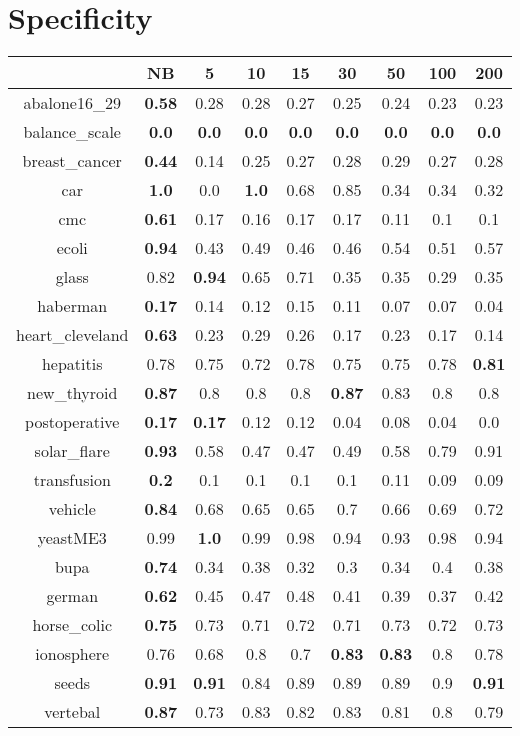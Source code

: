 \documentclass{article}%
\begin{document}
%
\section*{Specificity}%
\begin{tabular}{c|cccccccc}%
\hline%
&NB&5&10&15&30&50&100&200\\%
\hline%
abalone16\_29&\textbf{0.58}&0.28&0.28&0.27&0.25&0.24&0.23&0.23\\%
\hline%
balance\_scale&\textbf{0.0}&\textbf{0.0}&\textbf{0.0}&\textbf{0.0}&\textbf{0.0}&\textbf{0.0}&\textbf{0.0}&\textbf{0.0}\\%
\hline%
breast\_cancer&\textbf{0.44}&0.14&0.25&0.27&0.28&0.29&0.27&0.28\\%
\hline%
car&\textbf{1.0}&0.0&\textbf{1.0}&0.68&0.85&0.34&0.34&0.32\\%
\hline%
cmc&\textbf{0.61}&0.17&0.16&0.17&0.17&0.11&0.1&0.1\\%
\hline%
ecoli&\textbf{0.94}&0.43&0.49&0.46&0.46&0.54&0.51&0.57\\%
\hline%
glass&0.82&\textbf{0.94}&0.65&0.71&0.35&0.35&0.29&0.35\\%
\hline%
haberman&\textbf{0.17}&0.14&0.12&0.15&0.11&0.07&0.07&0.04\\%
\hline%
heart\_cleveland&\textbf{0.63}&0.23&0.29&0.26&0.17&0.23&0.17&0.14\\%
\hline%
hepatitis&0.78&0.75&0.72&0.78&0.75&0.75&0.78&\textbf{0.81}\\%
\hline%
new\_thyroid&\textbf{0.87}&0.8&0.8&0.8&\textbf{0.87}&0.83&0.8&0.8\\%
\hline%
postoperative&\textbf{0.17}&\textbf{0.17}&0.12&0.12&0.04&0.08&0.04&0.0\\%
\hline%
solar\_flare&\textbf{0.93}&0.58&0.47&0.47&0.49&0.58&0.79&0.91\\%
\hline%
transfusion&\textbf{0.2}&0.1&0.1&0.1&0.1&0.11&0.09&0.09\\%
\hline%
vehicle&\textbf{0.84}&0.68&0.65&0.65&0.7&0.66&0.69&0.72\\%
\hline%
yeastME3&0.99&\textbf{1.0}&0.99&0.98&0.94&0.93&0.98&0.94\\%
\hline%
bupa&\textbf{0.74}&0.34&0.38&0.32&0.3&0.34&0.4&0.38\\%
\hline%
german&\textbf{0.62}&0.45&0.47&0.48&0.41&0.39&0.37&0.42\\%
\hline%
horse\_colic&\textbf{0.75}&0.73&0.71&0.72&0.71&0.73&0.72&0.73\\%
\hline%
ionosphere&0.76&0.68&0.8&0.7&\textbf{0.83}&\textbf{0.83}&0.8&0.78\\%
\hline%
seeds&\textbf{0.91}&\textbf{0.91}&0.84&0.89&0.89&0.89&0.9&\textbf{0.91}\\%
\hline%
vertebal&\textbf{0.87}&0.73&0.83&0.82&0.83&0.81&0.8&0.79\\%
\hline%
\end{tabular}
\end{document}
